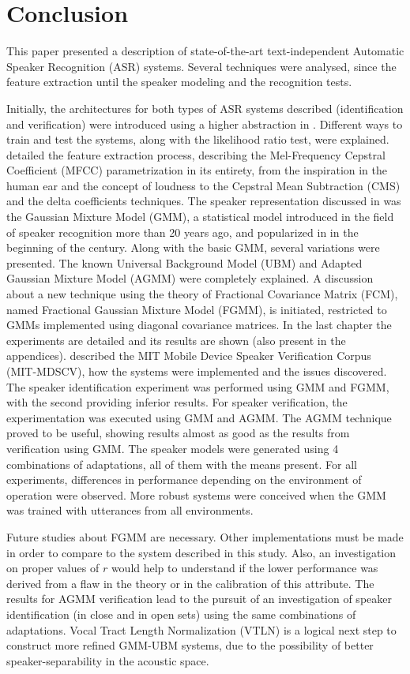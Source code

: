 \chapter{Conclusion}
\label{ch:conclusion}

This paper presented a description of state-of-the-art text-independent Automatic Speaker Recognition (ASR) systems. Several techniques were analysed, since the feature extraction until the speaker modeling and the recognition tests.

Initially, the architectures for both types of ASR systems described (identification and verification) were introduced using a higher abstraction in . Different ways to train and test the systems, along with the likelihood ratio test, were explained.  detailed the feature extraction process, describing the Mel-Frequency Cepstral Coefficient (MFCC) parametrization in its entirety, from the inspiration in the human ear and the concept of loudness to the Cepstral Mean Subtraction (CMS) and the delta coefficients techniques. The speaker representation discussed in  was the Gaussian Mixture Model (GMM), a statistical model introduced in the field of speaker recognition more than 20 years ago, and popularized in in the beginning of the century. Along with the basic GMM, several variations were presented. The known Universal Background Model (UBM) and Adapted Gaussian Mixture Model (AGMM) were completely explained. A discussion about a new technique using the theory of Fractional Covariance Matrix (FCM), named Fractional Gaussian Mixture Model (FGMM), is initiated, restricted to GMMs implemented using diagonal covariance matrices. In the last chapter the experiments are detailed and its results are shown (also present in the appendices).  described the MIT Mobile Device Speaker Verification Corpus (MIT-MDSCV), how the systems were implemented and the issues discovered. The speaker identification experiment was performed using GMM and FGMM, with the second providing inferior results. For speaker verification, the experimentation was executed using GMM and AGMM. The AGMM technique proved to be useful, showing results almost as good as the results from verification using GMM. The speaker models were generated using 4 combinations of adaptations, all of them with the means present. For all experiments, differences in performance depending on the environment of operation were observed. More robust systems were conceived when the GMM was trained with utterances from all environments.

Future studies about FGMM are necessary. Other implementations must be made in order to compare to the system described in this study. Also, an investigation on proper values of $r$ would help to understand if the lower performance was derived from a flaw in the theory or in the calibration of this attribute. The results for AGMM verification lead to the pursuit of an investigation of speaker identification (in close and in open sets) using the same combinations of adaptations. Vocal Tract Length Normalization (VTLN) is a logical next step to construct more refined GMM-UBM systems, due to the possibility of better speaker-separability in the acoustic space.